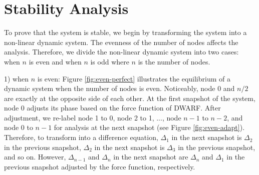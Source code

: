 \section{Stability Analysis}
\label{sec:stability}
To prove that the system is stable, we begin by transforming the system into a non-linear dynamic system. 
The evenness of the number of nodes affects the analysis. Therefore, we divide the non-linear dynamic system into two cases: when $n$ is even and when $n$ is odd where $n$ is the number of nodes.

1) when $n$ is even: Figure \ref{fig:even-perfect} illustrates the equilibrium of a dynamic system when the number of nodes is even. Noticeably, node 0 and $n/2$ are exactly at the opposite side of each other. At the first snapshot of the system, node 0 adjusts its phase based on the force function of DWARF. After adjustment, we re-label node 1 to 0, node 2 to 1, ..., node $n-1$ to $n-2$, and node 0 to $n-1$ for analysis at the next snapshot (see Figure \ref{fig:even-adapt}).
Therefore, to transform into a difference equation, $\Delta_{1}$ in the next snapshot is $\Delta_{2}$ in the previous snapshot, $\Delta_{2}$ in the next snapshot is $\Delta_{3}$ in the previous snapshot, and so on. However, $\Delta_{n-1}$ and $\Delta_{n}$ in the next snapshot are $\Delta_{n}$ and $\Delta_{1}$ in the previous snapshot adjusted by the force function, respectively.
